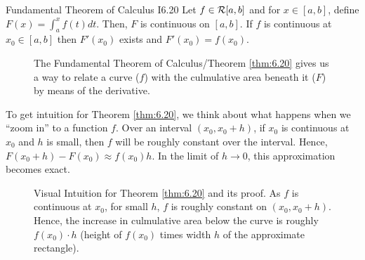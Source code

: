 \begin{theorem}{Fundamental Theorem of Calculus I}{6.20}
    Let $f \in \mathcal{R}[a, b]$ and for $x \in [a, b]$, define $F(x) = \int_a^x f(t)dt$. Then, $F$ is continuous on $[a, b]$. If $f$ is continuous at $x_0 \in [a, b]$ then $F'(x_0)$ exists and $F'(x_0) = f(x_0)$.  
\end{theorem}
\begin{figure}[htbp]
    \centering
    
    \caption{The Fundamental Theorem of Calculus/Theorem \ref{thm:6.20} gives us a way to relate a curve ($f$) with the culmulative area beneath it ($F$) by means of the derivative.}
    \label{fig35}
\end{figure}

To get intuition for Theorem \ref{thm:6.20}, we think about what happens when we ``zoom in'' to a function $f$. Over an interval $(x_0, x_0 + h)$, if $x_0$ is continuous at $x_0$ and $h$ is small, then $f$ will be roughly constant over the interval. Hence, $F(x_0 + h) - F(x_0) \approx f(x_0)h$. In the limit of $h \rightarrow 0$, this approximation becomes exact. 

\begin{figure}[htbp]
    \centering
    
    \caption{Visual Intuition for Theorem \ref{thm:6.20} and its proof. As $f$ is continuous at $x_0$, for small $h$, $f$ is roughly constant on $(x_0, x_0 + h)$. Hence, the increase in culmulative area below the curve is roughly $f(x_0)\cdot h$ (height of $f(x_0)$ times width $h$ of the approximate rectangle).}
    \label{fig36}
\end{figure}

